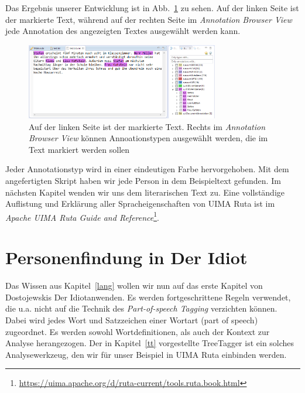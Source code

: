 \documentclass{article}
\begin{document}
Das Ergebnis unserer Entwicklung ist in Abb.~\ref{marked} zu sehen. Auf der linken Seite ist der markierte Text, während auf der rechten Seite im \textit{Annotation Browser View} jede Annotation des angezeigten Textes ausgewählt werden kann.

\begin{figure}
\centering
\includegraphics[width=0.75\textwidth]{figs/capture_marked.png}
\caption{Auf der linken Seite ist der markierte Text. Rechts im \textit{Annotation Browser View} können Annoationstypen ausgewählt werden, die im Text markiert werden sollen}
\label{marked}
\end{figure}

Jeder Annotationstyp wird in einer eindeutigen Farbe hervorgehoben. Mit dem angefertigten Skript haben wir jede Person in dem Beispieltext gefunden. Im nächsten Kapitel wenden wir uns dem literarischen Text zu. Eine vollständige Auflistung und Erklärung aller Spracheigenschaften von UIMA Ruta ist im \textit{Apache UIMA{\texttrademark} Ruta Guide and Reference}\footnote{\url{https://uima.apache.org/d/ruta-current/tools.ruta.book.html}}.

\section{Personenfindung in \glqq Der Idiot\grqq}
Das Wissen aus Kapitel~\ref{lang} wollen wir nun auf das erste Kapitel von Dostojewskis \glqq Der Idiot\grqq anwenden. Es werden fortgeschrittene Regeln verwendet, die u.a. nicht auf die Technik des \textit{Part-of-speech Tagging} verzichten können. Dabei wird jedes Wort und Satzzeichen einer Wortart (part of speech) zugeordnet. Es werden sowohl Wortdefinitionen, als auch der Kontext zur Analyse herangezogen. Der in Kapitel~\ref{tt} vorgestellte TreeTagger ist ein solches Analysewerkzeug, den wir für unser Beispiel in UIMA Ruta einbinden werden.
\end{document}
